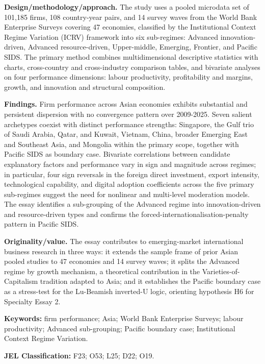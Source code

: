 \documentclass[12pt,a4paper]{article}
\begin{document}
\textbf{Design/methodology/approach.} The study uses a pooled microdata
set of 101,185 firms, 108 country-year pairs, and 14 survey waves from
the World Bank Enterprise Surveys covering 47 economies, classified by
the Institutional Context Regime Variation (ICRV) framework into six
sub-regimes: Advanced innovation-driven, Advanced resource-driven,
Upper-middle, Emerging, Frontier, and Pacific SIDS. The primary method
combines multidimensional descriptive statistics with charts,
cross-country and cross-industry comparison tables, and bivariate
analyses on four performance dimensions: labour productivity,
profitability and margins, growth, and innovation and structural
composition.

\textbf{Findings.} Firm performance across Asian economies exhibits
substantial and persistent dispersion with no convergence pattern over
2009-2025. Seven salient archetypes coexist with distinct performance
strengths: Singapore, the Gulf trio of Saudi Arabia, Qatar, and Kuwait,
Vietnam, China, broader Emerging East and Southeast Asia, and Mongolia
within the primary scope, together with Pacific SIDS as boundary case.
Bivariate correlations between candidate explanatory factors and
performance vary in sign and magnitude across regimes; in particular,
four sign reversals in the foreign direct investment, export intensity,
technological capability, and digital adoption coefficients across the
five primary sub-regimes suggest the need for nonlinear and multi-level
moderation models. The essay identifies a sub-grouping of the Advanced
regime into innovation-driven and resource-driven types and confirms the
forced-internationalisation-penalty pattern in Pacific SIDS.

\textbf{Originality/value.} The essay contributes to emerging-market
international business research in three ways: it extends the sample
frame of prior Asian pooled studies to 47 economies and 14 survey waves;
it splits the Advanced regime by growth mechanism, a theoretical
contribution in the Varieties-of-Capitalism tradition adapted to Asia;
and it establishes the Pacific boundary case as a stress-test for the
Lu-Beamish inverted-U logic, orienting hypothesis H6 for Specialty Essay
2.

\textbf{Keywords:} firm performance; Asia; World Bank Enterprise
Surveys; labour productivity; Advanced sub-grouping; Pacific boundary
case; Institutional Context Regime Variation.

\textbf{JEL Classification:} F23; O53; L25; D22; O19.
\end{document}
